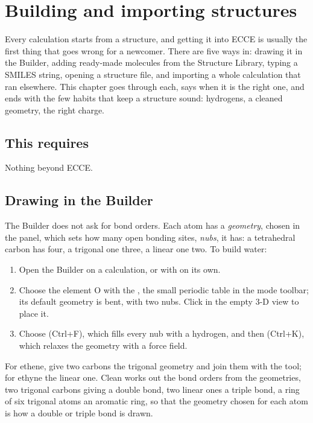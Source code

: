 \chapter{Building and importing structures}
\label{ch:structures}

Every calculation starts from a structure, and getting it into ECCE is usually the first thing that goes wrong for a newcomer. There are five ways in: drawing it in the Builder, adding ready-made molecules from the Structure Library, typing a SMILES string, opening a structure file, and importing a whole calculation that ran elsewhere. This chapter goes through each, says when it is the right one, and ends with the few habits that keep a structure sound: hydrogens, a cleaned geometry, the right charge.

\section*{This requires}
Nothing beyond ECCE.

\section{Drawing in the Builder}
The Builder does not ask for bond orders. Each atom has a \emph{geometry}, chosen in the  panel, which sets how many open bonding sites, \emph{nubs}, it has: a tetrahedral carbon has four, a trigonal one three, a linear one two. To build water:
\begin{enumerate}
	\item Open the Builder on a calculation, or with  on its own.
	\item Choose the element O with the , the small periodic table in the mode toolbar; its default geometry is bent, with two nubs. Click in the empty 3-D view to place it.
	\item Choose  (\textsf{Ctrl+F}), which fills every nub with a hydrogen, and then  (\textsf{Ctrl+K}), which relaxes the geometry with a force field.
\end{enumerate}
For ethene, give two carbons the trigonal geometry and join them with the  tool; for ethyne the linear one. Clean works out the bond orders from the geometries, two trigonal carbons giving a double bond, two linear ones a triple bond, a ring of six trigonal atoms an aromatic ring, so that the geometry chosen for each atom is how a double or triple bond is drawn.

